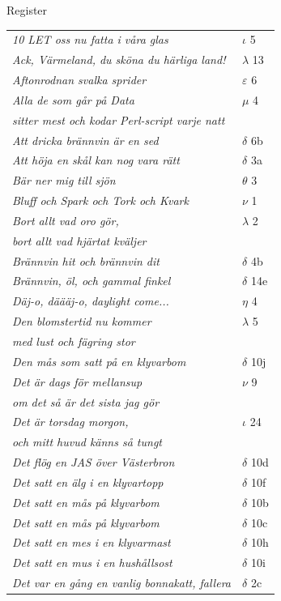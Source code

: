 \documentclass[a6paper,10pt]{article}
\begin{document}
\noindent\Large Register
\begin{table}[!h]
\begin{tabular}{l l}
\textit{10 LET oss nu fatta i våra glas}	&$\iota$ 5\\
\textit{Ack, Värmeland, du sköna du härliga land!}	&$\lambda$ 13\\
\textit{Aftonrodnan svalka sprider}	&$\varepsilon$ 6\\
\textit{Alla de som går på Data}	&$\mu$ 4\\
\textit{sitter mest och kodar Perl-script varje natt}&\\
\textit{Att dricka brännvin är en sed}	&$\delta$ 6b\\
\textit{Att höja en skål kan nog vara rätt}	&$\delta$ 3a\\
\textit{Bär ner mig till sjön}	&$\theta$ 3\\
\textit{Bluff och Spark och Tork och Kvark}	&$\nu$ 1\\
\textit{Bort allt vad oro gör,}	&$\lambda$ 2\\
\textit{bort allt vad hjärtat kväljer}&\\
\textit{Brännvin hit och brännvin dit}	&$\delta$ 4b\\
\textit{Brännvin, öl, och gammal finkel}	&$\delta$ 14e\\
\textit{Däj-o, däääj-o, daylight come...}	&$\eta$ 4\\
\textit{Den blomstertid nu kommer}	&$\lambda$ 5\\
\textit{med lust och fägring stor}&\\
\textit{Den mås som satt på en klyvarbom}	&$\delta$ 10j\\
\textit{Det är dags för mellansup}	&$\nu$ 9\\
\textit{om det så är det sista jag gör}&\\
\textit{Det är torsdag morgon,}&$\iota$ 24\\
\textit{och mitt huvud känns så tungt}&\\
\textit{Det flög en JAS över Västerbron}	&$\delta$ 10d\\
\textit{Det satt en älg i en klyvartopp}	&$\delta$ 10f\\
\textit{Det satt en mås på klyvarbom}	&$\delta$ 10b\\
\textit{Det satt en mås på klyvarbom}	&$\delta$ 10c\\
\textit{Det satt en mes i en klyvarmast}	&$\delta$ 10h\\
\textit{Det satt en mus i en hushållsost}	&$\delta$ 10i\\
\textit{Det var en gång en vanlig bonnakatt, fallera}	&$\delta$ 2c\\
\end{tabular}
\end{table}
\end{document}
